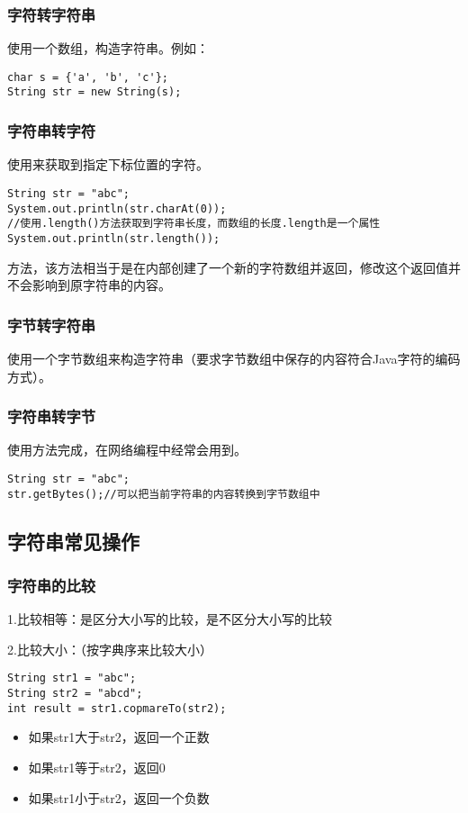 \documentclass[a4paper]{report}
\begin{document}
\subsubsection{字符转字符串}
使用一个数组，构造字符串。例如：
\begin{lstlisting}[title=字符转字符串]
char s = {'a', 'b', 'c'};
String str = new String(s);
\end{lstlisting}
\subsubsection{字符串转字符}
使用来获取到指定下标位置的字符。
\begin{lstlisting}[title=字符串转字符]
String str = "abc";
System.out.println(str.charAt(0));
//使用.length()方法获取到字符串长度，而数组的长度.length是一个属性
System.out.println(str.length());
\end{lstlisting}

方法，该方法相当于是在内部创建了一个新的字符数组并返回，修改这个返回值并不会影响到原字符串的内容。
\subsubsection{字节转字符串}
使用一个字节数组来构造字符串（要求字节数组中保存的内容符合Java字符的编码方式）。


\subsubsection{字符串转字节}
使用方法完成，在网络编程中经常会用到。
\begin{lstlisting}[title=字符串转字节]
String str = "abc";
str.getBytes();//可以把当前字符串的内容转换到字节数组中
\end{lstlisting}
\subsection{字符串常见操作}
\subsubsection{字符串的比较}
1.比较相等：是区分大小写的比较，是不区分大小写的比较

2.比较大小：（按字典序来比较大小）

\begin{lstlisting}[title=字符串比较大小]
String str1 = "abc";
String str2 = "abcd";
int result = str1.copmareTo(str2);
\end{lstlisting}
\begin{itemize}
\itemsep=0pt \parskip =0pt
  \item 如果str1大于str2，返回一个正数
  \item 如果str1等于str2，返回0
  \item 如果str1小于str2，返回一个负数
\end{itemize}
\end{document}
